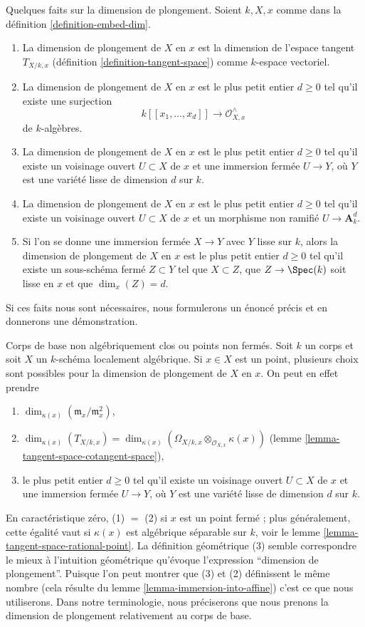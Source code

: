 \noindent
Quelques faits sur la dimension de plongement.
Soient $k, X, x$ comme dans la définition \ref{definition-embed-dim}.
\begin{enumerate}
\item La dimension de plongement de $X$ en $x$ est
la dimension de
l'espace tangent $T_{X/k, x}$ (définition \ref{definition-tangent-space})
comme $k$-espace vectoriel.
\item La dimension de plongement de $X$ en $x$ est le plus petit entier
$d \geq 0$ tel qu'il existe une surjection
$$
k[[x_1, \ldots, x_d]] \longrightarrow \mathcal{O}_{X, x}^\wedge
$$
de $k$-algèbres.
\item La dimension de plongement de $X$ en $x$ est le plus petit entier
$d \geq 0$ tel qu'il existe un voisinage ouvert $U \subset X$
de $x$ et une immersion fermée $U \to Y$, où $Y$ est une variété lisse
de dimension $d$ sur $k$.
\item La dimension de plongement de $X$ en $x$ est le plus petit entier
$d \geq 0$ tel qu'il existe un voisinage ouvert $U \subset X$
de $x$ et un morphisme non ramifié $U \to \mathbf{A}^d_k$.
\item Si l'on se donne une immersion fermée $X \to Y$ avec $Y$ lisse
sur $k$, alors la dimension de plongement de $X$ en $x$ est le plus petit
entier $d \geq 0$ tel qu'il existe un sous-schéma fermé $Z \subset Y$
tel que $X \subset Z$, que $Z \to \Spec(k)$ soit lisse en $x$ et que
$\dim_x(Z) = d$.
\end{enumerate}
Si ces faits nous sont nécessaires, nous formulerons un énoncé précis et en donnerons
une démonstration.

\medskip\noindent
Corps de base non algébriquement clos ou points non fermés.
Soit $k$ un corps et soit $X$ un $k$-schéma localement algébrique.
Si $x \in X$ est un point, plusieurs choix sont possibles pour la
dimension de plongement de $X$ en $x$. On peut en effet prendre
\begin{enumerate}
\item $\dim_{\kappa(x)}(\mathfrak m_x/\mathfrak m_x^2)$,
\item $\dim_{\kappa(x)}(T_{X/k, x}) =
\dim_{\kappa(x)}(\Omega_{X/k, x} \otimes_{\mathcal{O}_{X, x}} \kappa(x))$
(lemme \ref{lemma-tangent-space-cotangent-space}),
\item le plus petit entier $d \geq 0$ tel qu'il existe un
voisinage ouvert $U \subset X$ de $x$ et une immersion fermée
$U \to Y$, où $Y$ est une variété lisse de dimension $d$ sur $k$.
\end{enumerate}
En caractéristique zéro, (1) $=$ (2) si $x$ est un point fermé ;
plus généralement, cette égalité vaut si $\kappa(x)$ est algébrique séparable
sur $k$, voir le
lemme \ref{lemma-tangent-space-rational-point}.
La définition géométrique (3) semble correspondre le mieux à
l'intuition géométrique qu'évoque l'expression
``dimension de plongement''.
Puisque l'on peut montrer que (3) et (2) définissent le même nombre
(cela résulte du lemme \ref{lemma-immersion-into-affine})
c'est ce que nous utiliserons.
Dans notre terminologie, nous préciserons que nous
prenons la dimension de plongement relativement au corps de base.

